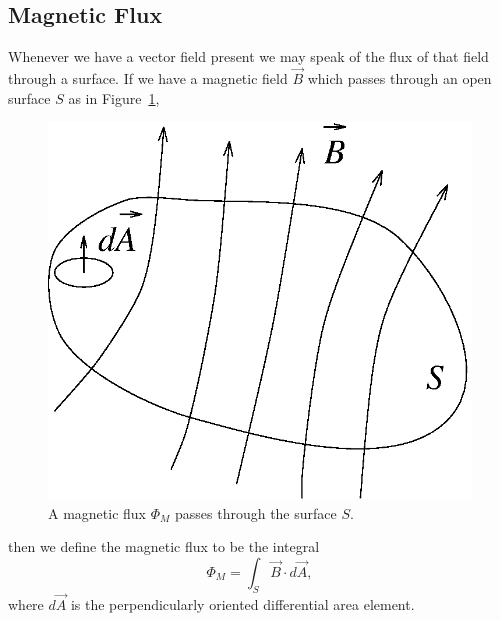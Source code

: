 \subsection{Magnetic Flux}

Whenever we have a vector field present we may speak of the flux of that field 
through a surface.  If we have a magnetic field $\vec{B}$ which passes through 
an open surface $S$ as in Figure~\ref{fig:ind:fluxdef},
\begin{figure}[htb]
\centering 
\epsfxsize=7cm \includegraphics[scale=0.6]{6_induction/fluxdef.eps}
\caption{A magnetic flux $\Phi_M$ passes through the surface $S$.}
\label{fig:ind:fluxdef}
\end{figure}
then we define the magnetic flux to be the integral
$$
\Phi_M=\int_S \vec{B}\cdot d\vec{A},
$$
where $d\vec{A}$ is the perpendicularly oriented differential area element.

